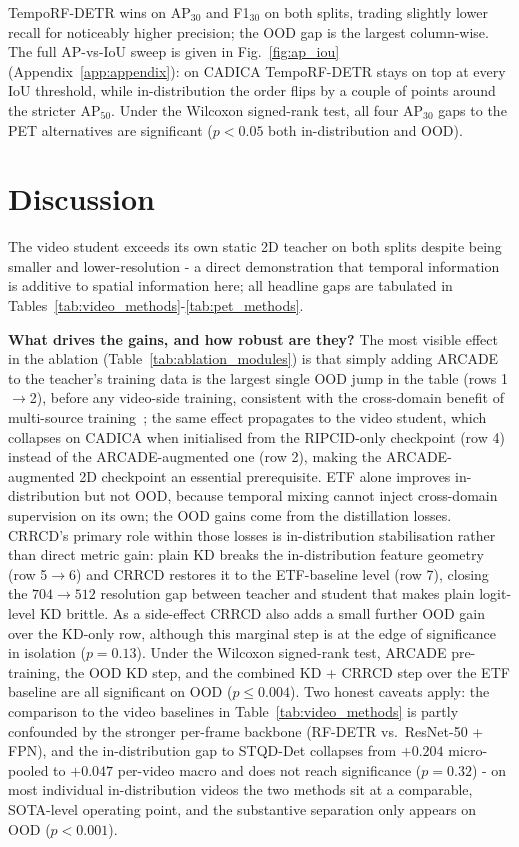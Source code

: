 \documentclass[conference]{IEEEtran}
\begin{document}
TempoRF-DETR wins on AP$_{30}$ and F1$_{30}$ on both splits, trading slightly lower recall for noticeably higher precision; the OOD gap is the largest column-wise. The full AP-vs-IoU sweep is given in Fig.~\ref{fig:ap_iou} (Appendix~\ref{app:appendix}): on CADICA TempoRF-DETR stays on top at every IoU threshold, while in-distribution the order flips by a couple of points around the stricter AP$_{50}$. Under the Wilcoxon signed-rank test, all four AP$_{30}$ gaps to the PET alternatives are significant ($p<0.05$ both in-distribution and OOD).

\section{Discussion}

The video student exceeds its own static 2D teacher on both splits despite being smaller and lower-resolution - a direct demonstration that temporal information is additive to spatial information here; all headline gaps are tabulated in Tables~\ref{tab:video_methods}-\ref{tab:pet_methods}.

\textbf{What drives the gains, and how robust are they?} The most visible effect in the ablation (Table~\ref{tab:ablation_modules}) is that simply adding ARCADE to the teacher's training data is the largest single OOD jump in the table (rows 1$\rightarrow$2), before any video-side training, consistent with the cross-domain benefit of multi-source training~\cite{liu2020msnet, tetteh2021multidomain}; the same effect propagates to the video student, which collapses on CADICA when initialised from the RIPCID-only checkpoint (row 4) instead of the ARCADE-augmented one (row 2), making the ARCADE-augmented 2D checkpoint an essential prerequisite. ETF alone improves in-distribution but not OOD, because temporal mixing cannot inject cross-domain supervision on its own; the OOD gains come from the distillation losses. CRRCD's primary role within those losses is in-distribution stabilisation rather than direct metric gain: plain KD breaks the in-distribution feature geometry (row 5$\rightarrow$6) and CRRCD restores it to the ETF-baseline level (row 7), closing the $704\!\to\!512$ resolution gap between teacher and student that makes plain logit-level KD brittle. As a side-effect CRRCD also adds a small further OOD gain over the KD-only row, although this marginal step is at the edge of significance in isolation ($p=0.13$). Under the Wilcoxon signed-rank test, ARCADE pre-training, the OOD KD step, and the combined KD + CRRCD step over the ETF baseline are all significant on OOD ($p\leq 0.004$). Two honest caveats apply: the comparison to the video baselines in Table~\ref{tab:video_methods} is partly confounded by the stronger per-frame backbone (RF-DETR vs.\ ResNet-50 + FPN), and the in-distribution gap to STQD-Det collapses from $+0.204$ micro-pooled to $+0.047$ per-video macro and does not reach significance ($p=0.32$) - on most individual in-distribution videos the two methods sit at a comparable, SOTA-level operating point, and the substantive separation only appears on OOD ($p<0.001$).
\end{document}
